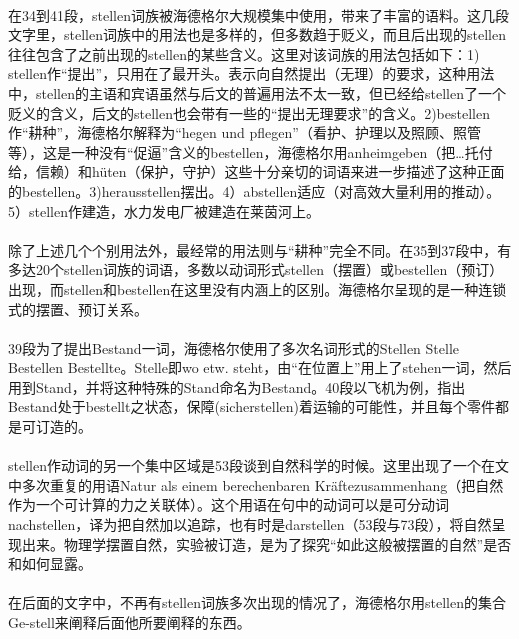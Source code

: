 \documentclass{article}
\begin{document}
		\paragraph{}
		在34到41段，stellen词族被海德格尔大规模集中使用，带来了丰富的语料。这几段文字里，stellen词族中的用法也是多样的，但多数趋于贬义，而且后出现的stellen往往包含了之前出现的stellen的某些含义。这里对该词族的用法包括如下：1) stellen作“提出”，只用在了最开头。表示向自然提出（无理）的要求，这种用法中，stellen的主语和宾语虽然与后文的普遍用法不太一致，但已经给stellen了一个贬义的含义，后文的stellen也会带有一些的“提出无理要求”的含义。2)bestellen作“耕种”，海德格尔解释为“hegen und pflegen”（看护、护理以及照顾、照管等），这是一种没有“促逼”含义的bestellen，海德格尔用anheimgeben（把…托付给，信赖）和hüten（保护，守护）这些十分亲切的词语来进一步描述了这种正面的bestellen。3)herausstellen摆出。4）abstellen适应（对高效大量利用的推动）。5）stellen作建造，水力发电厂被建造在莱茵河上。
		\paragraph{}
		除了上述几个个别用法外，最经常的用法则与“耕种”完全不同。在35到37段中，有多达20个stellen词族的词语，多数以动词形式stellen（摆置）或bestellen（预订）出现，而stellen和bestellen在这里没有内涵上的区别。海德格尔呈现的是一种连锁式的摆置、预订关系。

		\paragraph{}
		39段为了提出Bestand一词，海德格尔使用了多次名词形式的Stellen Stelle Bestellen Bestellte。Stelle即wo etw. steht\cite{yellow_etym}，由“在位置上”用上了stehen一词，然后用到Stand，并将这种特殊的Stand命名为Bestand。40段以飞机为例，指出Bestand处于bestellt之状态，保障(sicherstellen)着运输的可能性，并且每个零件都是可订造的。
		
		
		\paragraph{}
		stellen作动词的另一个集中区域是53段谈到自然科学的时候。这里出现了一个在文中多次重复的用语Natur als einem berechenbaren Kräftezusammenhang（把自然作为一个可计算的力之关联体）。这个用语在句中的动词可以是可分动词nachstellen，译为把自然加以追踪，也有时是darstellen（53段与73段），将自然呈现出来。物理学摆置自然，实验被订造，是为了探究“如此这般被摆置的自然”是否和如何显露。
		\paragraph{}
		在后面的文字中，不再有stellen词族多次出现的情况了，海德格尔用stellen的集合Ge-stell来阐释后面他所要阐释的东西。
\end{document}
